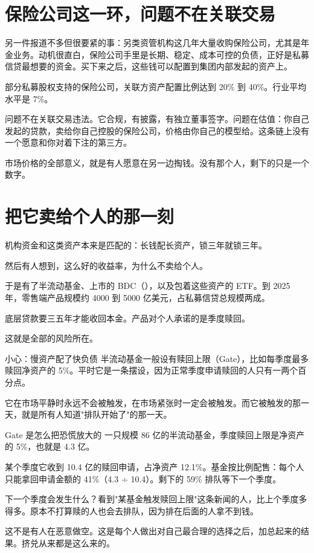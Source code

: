 \section{保险公司这一环，问题不在关联交易}

另一件报道不多但很要紧的事：另类资管机构这几年大量收购保险公司，尤其是年金业务。动机很直白，保险公司手里是长期、稳定、成本可控的负债，正好是私募信贷最想要的资金。买下来之后，这些钱可以配置到集团内部发起的资产上。

部分私募股权支持的保险公司，关联方资产配置比例达到 20\% 到 40\%。行业平均水平是 7\%。

\begin{barfig}
\end{barfig}

问题不在关联交易违法。它合规，有披露，有独立董事签字。问题在估值：你自己发起的贷款，卖给你自己控股的保险公司，价格由你自己的模型给。这条链上没有一个愿意和你对着下注的第三方。

市场价格的全部意义，就是有人愿意在另一边掏钱。没有那个人，剩下的只是一个数字。

\section{把它卖给个人的那一刻}

机构资金和这类资产本来是匹配的：长钱配长资产，锁三年就锁三年。

然后有人想到，这么好的收益率，为什么不卖给个人。

于是有了半流动基金、上市的 BDC（），以及包着这些资产的 ETF。到 2025 年，零售端产品规模约 4000 到 5000 亿美元，占私募信贷总规模两成。

底层贷款要三五年才能收回本金。产品对个人承诺的是季度赎回。

这就是全部的风险所在。

\begin{warnbox}{小心：慢资产配了快负债}
半流动基金一般设有赎回上限（Gate），比如每季度最多赎回净资产的 5\%。平时它是一条摆设，因为正常季度申请赎回的人只有一两个百分点。

它在市场平静时永远不会被触发，在市场紧张时一定会被触发。而它被触发的那一天，就是所有人知道"排队开始了"的那一天。

\end{warnbox}

\begin{egbox}{Gate 是怎么把恐慌放大的}
一只规模 86 亿的半流动基金，季度赎回上限是净资产的 5\%，也就是 4.3 亿。

某个季度它收到 10.4 亿的赎回申请，占净资产 12.1\%。基金按比例配售：每个人只能拿回申请金额的 41\%（4.3 ÷ 10.4）。剩下的 59\% 排队等下一个季度。

下一个季度会发生什么？看到"某基金触发赎回上限"这条新闻的人，比上个季度多得多。原本不打算赎的人也会去排队，因为排在后面的人拿不到钱。

这不是有人在恶意做空。这是每个人做出对自己最合理的选择之后，加总起来的结果。挤兑从来都是这么来的。

\end{egbox}

